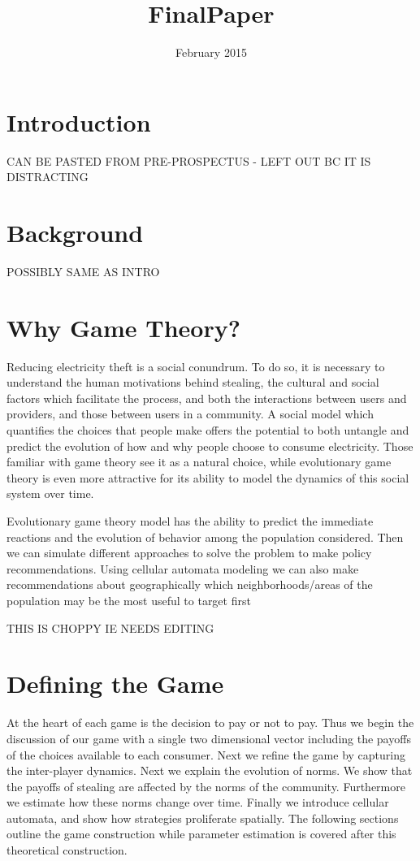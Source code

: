 \documentclass{article}
\title{FinalPaper}
\author{ }
\date{February 2015}
\begin{document}
\maketitle

\section{Introduction}
CAN BE PASTED FROM PRE-PROSPECTUS - LEFT OUT BC IT IS DISTRACTING


\section{Background}
POSSIBLY SAME AS INTRO

\section{Why Game Theory?}
Reducing electricity theft is a social conundrum. To do so, it is necessary to understand the human motivations behind stealing, the cultural and social factors which facilitate the process, and both the interactions between users and providers, and those between users in a community. A social model which quantifies the choices that people make offers the potential to both untangle and predict the evolution of how and why people choose to consume electricity. Those familiar with game theory see it as a natural choice, while evolutionary game theory is even more attractive for its ability to model the dynamics of this social system over time. 

Evolutionary game theory model has the ability to predict the immediate reactions and the evolution of behavior among the population considered. Then we can simulate different approaches to solve the problem to make policy recommendations. Using cellular automata modeling we can also make recommendations about geographically which neighborhoods/areas of the population may be the most useful to target first
                          
THIS IS CHOPPY IE NEEDS EDITING

\section{Defining the Game}
At the heart of each game is the decision to pay or not to pay. Thus we begin the discussion of our game with a single two dimensional vector including the payoffs of the choices available to each consumer. Next we refine the game by capturing the inter-player dynamics. Next we explain the evolution of norms. We show that the payoffs of stealing are affected by the norms of the community. Furthermore we estimate how these norms change over time. Finally we introduce cellular automata, and show how strategies proliferate spatially. The following sections outline the game construction while parameter estimation is covered after this theoretical construction. \\ 
\end{document}
